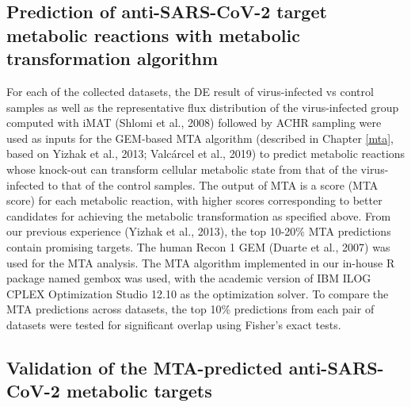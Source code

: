 \documentclass[12pt,twoside,openany,\mydriver]{thesis}  %
\begin{document}
\hypertarget{prediction-of-anti-sars-cov-2-target-metabolic-reactions-with-metabolic-transformation-algorithm}{%
\subsection{Prediction of anti-SARS-CoV-2 target metabolic reactions with metabolic transformation algorithm}\label{prediction-of-anti-sars-cov-2-target-metabolic-reactions-with-metabolic-transformation-algorithm}}

For each of the collected datasets, the DE result of virus-infected vs control samples as well as the representative flux distribution of the virus-infected group computed with iMAT (Shlomi et al., 2008) followed by ACHR sampling were used as inputs for the GEM-based MTA algorithm (described in Chapter \ref{mta}, based on Yizhak et al., 2013; Valcárcel et al., 2019) to predict metabolic reactions whose knock-out can transform cellular metabolic state from that of the virus-infected to that of the control samples. The output of MTA is a score (MTA score) for each metabolic reaction, with higher scores corresponding to better candidates for achieving the metabolic transformation as specified above. From our previous experience (Yizhak et al., 2013), the top 10-20\% MTA predictions contain promising targets. The human Recon 1 GEM (Duarte et al., 2007) was used for the MTA analysis. The MTA algorithm implemented in our in-house R package named gembox was used, with the academic version of IBM ILOG CPLEX Optimization Studio 12.10 as the optimization solver. To compare the MTA predictions across datasets, the top 10\% predictions from each pair of datasets were tested for significant overlap using Fisher's exact tests.

\hypertarget{validation-of-the-mta-predicted-anti-sars-cov-2-metabolic-targets}{%
\subsection{Validation of the MTA-predicted anti-SARS-CoV-2 metabolic targets}\label{validation-of-the-mta-predicted-anti-sars-cov-2-metabolic-targets}}
\end{document}

